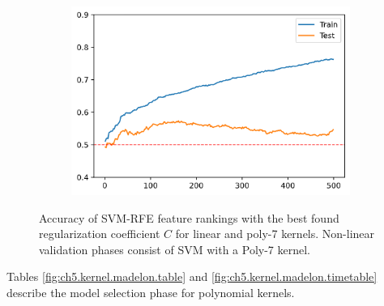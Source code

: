 \begin{figure}[H]
\begin{subfigure}[b]{0.32\linewidth}
    \end{subfigure}
    \begin{subfigure}[b]{0.32\linewidth}
        \includegraphics[width=\linewidth]{img/ch5/madelon-random-c_1}
    \end{subfigure}
    \caption[Non-linear kernel: SVM-RFE comparison linear vs non-linear for Madelon]{Accuracy of SVM-RFE feature rankings with the best found regularization coefficient $C$ for linear and poly-7 kernels. Non-linear validation phases consist of SVM with a Poly-7 kernel.}
    \label{fig:ch5.kernel.cmp3}
\end{figure}

Tables \ref{fig:ch5.kernel.madelon.table} and \ref{fig:ch5.kernel.madelon.timetable} describe the model selection phase for polynomial kernels.


